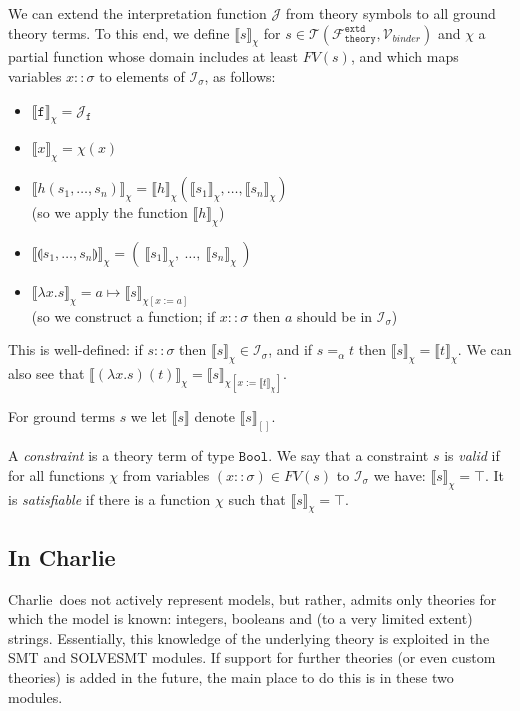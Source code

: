 \documentclass{lmcs}
\theoremstyle{theorem}\newtheorem{theorem}{Theorem}
\theoremstyle{theorem}\newtheorem{lemma}[theorem]{Lemma}
\theoremstyle{theorem}\newtheorem{corollary}[theorem]{Corollary}
\theoremstyle{definition}\newtheorem{definition}[theorem]{Definition}
\theoremstyle{definition}\newtheorem{example}[theorem]{Example}
\newcommand{\thFext}{\mathcal{F}_{\mathtt{theory}}^{\mathtt{extd}}}
\newcommand{\Vbound}{\mathcal{V}_{\mathit{binder}}}
\newcommand{\Terms}{\mathcal{T}}
\newcommand{\FV}{\mathit{FV}}
\newcommand{\I}{\mathcal{I}}
\newcommand{\J}{\mathcal{J}}
\newcommand{\atype}{\sigma}
\newcommand{\identifier}[1]{\mathtt{#1}}
\newcommand{\afun}{\identifier{f}}
\newcommand{\avar}{x}
\newcommand{\abs}[2]{\lambda #1.#2}
\newcommand{\tuple}[2]{\llparenthesis #1,\dots,#2 \rrparenthesis}
\newcommand{\interpret}[1]{\llbracket #1 \rrbracket}
\newcommand{\symb}[1]{\mathtt{#1}}
\newcommand{\bool}{\symb{Bool}}
\newcommand{\charlie}{\textsf{Charlie}\xspace}
\begin{document}
We can extend the interpretation function $\J$ from theory symbols to all ground
theory terms.  To this end, we define $\interpret{s}_\chi$ for $s \in
\Terms(\thFext,\Vbound)$ and $\chi$ a partial function whose domain includes
at least $\FV(s)$, and which maps variables $x :: \atype$ to elements of
$\I_\atype$, as follows:
\begin{itemize}
\item $\interpret{\afun}_\chi = \J_\afun$
\item $\interpret{\avar}_\chi = \chi(\avar)$
\item $\interpret{h(s_1,\dots,s_n)}_\chi =
  \interpret{h}_\chi(\interpret{s_1}_\chi,\dots,\interpret{s_n}_\chi)$
  \\ (so we apply the function $\interpret{h}_\chi$)
\item $\interpret{\tuple{s_1}{s_n}}_\chi =
  (\ \interpret{s_1}_\chi,\ \dots,\ \interpret{s_n}_\chi\ )$
\item $\interpret{\abs{\avar}{s}}_\chi =
  a \mapsto \interpret{s}_{\chi[\avar:=a]}$
  \\ (so we construct a function; if $\avar :: \atype$ then $a$ should be
  in $\I_\atype$)
\end{itemize}
This is well-defined: if $s :: \atype$ then $\interpret{s}_\chi \in \I_\atype$,
and if $s =_\alpha t$ then $\interpret{s}_\chi = \interpret{t}_\chi$.
We can also see that $\interpret{(\abs{\avar}{s})(t)}_\chi =
\interpret{s}_{\chi[\avar:=\interpret{t}_\chi]}$.

For ground terms $s$ we let $\interpret{s}$ denote $\interpret{s}_{[]}$.

A \emph{constraint} is a theory term of type $\bool$.  We say that a constraint
$s$ is \emph{valid} if for all functions $\chi$ from variables $(\avar ::
\atype) \in \FV(s)$ to $\I_\atype$ we have: $\interpret{s}_\chi = \top$.
It is \emph{satisfiable} if there is a function $\chi$ such that
$\interpret{s}_\chi = \top$.

\subsection*{In \charlie}

\charlie\ does not actively represent models, but rather, admits only theories
for which the model is known: integers, booleans and (to a very limited extent)
strings.  Essentially, this knowledge of the underlying theory is exploited in
the SMT and SOLVESMT modules.  If support for further theories (or even custom
theories) is added in the future, the main place to do this is in these two
modules.
\end{document}
